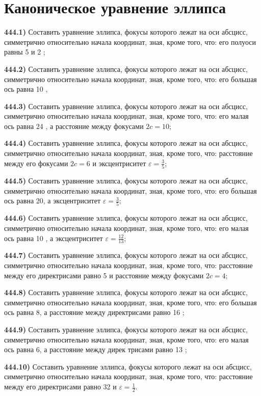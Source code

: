 \section{Каноническое уравнение эллипса}



\textbf{444.1)} Составить уравнение эллипса, фокусы которого лежат на оси абсцисс, симметрично относительно начала координат, зная, кроме того, что: его полуоси равны 5 и 2 ;

\textbf{444.2)} Составить уравнение эллипса, фокусы которого лежат на оси абсцисс, симметрично относительно начала координат, зная, кроме того, что: его большая ось равна 10 ,

\textbf{444.3)} Составить уравнение эллипса, фокусы которого лежат на оси абсцисс, симметрично относительно начала координат, зная, кроме того, что: его малая ось равна 24 , а расстояние между фокусами $2 c=10$;

\textbf{444.4)} Составить уравнение эллипса, фокусы которого лежат на оси абсцисс, симметрично относительно начала координат, зная, кроме того, что: расстояние между его фокусами $2 c=6$ и эксцентриситет $\varepsilon=\frac{3}{5}$;

\textbf{444.5)} Составить уравнение эллипса, фокусы которого лежат на оси абсцисс, симметрично относительно начала координат, зная, кроме того, что: его большая ось равна 20, а эксцентриситет $\varepsilon=\frac{3}{5}$;

\textbf{444.6)} Составить уравнение эллипса, фокусы которого лежат на оси абсцисс, симметрично относительно начала координат, зная, кроме того, что: его малая ось равна 10 , а эксцентриситет $\varepsilon=\frac{12}{13}$;

\textbf{444.7)} Составить уравнение эллипса, фокусы которого лежат на оси абсцисс, симметрично относительно начала координат, зная, кроме того, что: расстояние между его директрисами равно 5 и расстояние между фокусами $2 c=4$;

\textbf{444.8)} Составить уравнение эллипса, фокусы которого лежат на оси абсцисс, симметрично относительно начала координат, зная, кроме того, что: его большая ось равна 8, а расстояние между директрисами равно 16 ;

\textbf{444.9)} Составить уравнение эллипса, фокусы которого лежат на оси абсцисс, симметрично относительно начала координат, зная, кроме того, что: его малая ось равна 6, а расстояние между дирек трисами равно 13 ;

\textbf{444.10)} Составить уравнение эллипса, фокусы которого лежат на оси абсцисс, симметрично относительно начала координат, зная, кроме того, что: расстояние между его директрисами равно 32 и $\varepsilon=\frac{1}{2}$.


